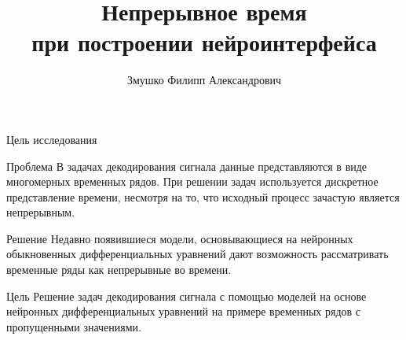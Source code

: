 \documentclass{beamer}
\title[\hbox to 56mm{Continuous time}]{Непрерывное время \\ при построении нейроинтерфейса}
\author[Ф.\,А. Змушко]{Змушко Филипп Александрович}
\institute{Московский физико-технический институт}
\date{\footnotesize
\par\smallskip\emph{Курс:} Моя первая научная статья
\par\smallskip\emph{Эксперт:} В.\,В.~Стрижов
\par\smallskip\emph{Консультант:} А.\,М.~Самохина
\par\bigskip\small 2022}
\begin{document}
\begin{frame}
\thispagestyle{empty}
\maketitle
\end{frame}
\begin{frame}{Цель исследования}
	
	\begin{alertblock}{Проблема}
        В задачах декодирования сигнала данные представляются в виде многомерных
        временных рядов. При решении задач используется дискретное представление
        времени, несмотря на то, что исходный процесс зачастую является непрерывным.
	\end{alertblock}
	
	\begin{alertblock}{Решение}
		Недавно появившиеся модели, основывающиеся на нейронных обыкновенных дифференциальных уравнений дают возможность рассматривать временные ряды как непрерывные во времени.
	\end{alertblock}
	
	\begin{alertblock}{Цель}
        Решение задач декодирования сигнала с помощью моделей на основе нейронных дифференциальных уравнений на примере временных рядов с пропущенными значениями.
	\end{alertblock}
\end{frame}
\end{document}
